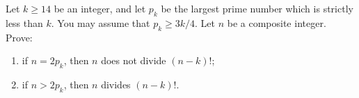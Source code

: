 Let $k\ge 14$ be an integer, and let $p_k$ be the largest prime number which is strictly less than $k$. You may assume that $p_k\ge 3k/4$. Let $n$ be a composite integer. Prove:
\begin{enumerate}[label=(\alph*)]
	\item if $n=2p_k$, then $n$ does not divide $(n-k)!$;
	\item if $n>2p_k$, then $n$ divides $(n-k)!$.
\end{enumerate}
